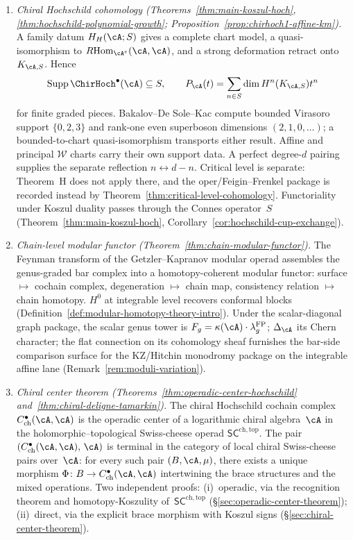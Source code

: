 \begin{enumerate}[label=\emph{(\arabic*)}]
\item \emph{Chiral Hochschild cohomology
 (Theorems~\ref{thm:main-koszul-hoch},
 \ref{thm:hochschild-polynomial-growth};
 Proposition~\ref{prop:chirhoch1-affine-km}).}
 A family datum $H_H(\cA;S)$ gives a complete chart model, a
 quasi-isomorphism to
 $R\!\operatorname{Hom}_{\cA^e}(\cA,\cA)$, and a strong deformation
 retract onto $K_{\cA,S}$.  Hence
 \[
  \operatorname{Supp}\ChirHoch^\bullet(\cA)\subseteq S,
  \qquad
  P_\cA(t)=\sum_{n\in S}\dim H^n(K_{\cA,S})t^n
 \]
 for finite graded pieces.  Bakalov--De Sole--Kac compute bounded
 Virasoro support $\{0,2,3\}$ and rank-one even superboson dimensions
 $(2,1,0,\ldots)$; a bounded-to-chart quasi-isomorphism transports
 either result.  Affine and principal $\mathcal W$ charts carry their
 own support data.  A perfect degree-$d$ pairing supplies the separate
 reflection $n\leftrightarrow d-n$.
 Critical level is separate:
 Theorem~H does not apply there, and the oper/Feigin--Frenkel package
 is recorded instead by Theorem~\ref{thm:critical-level-cohomology}.
 Functoriality under Koszul duality passes through the Connes
 operator~$S$
 \textup{(}Theorem~\ref{thm:main-koszul-hoch},
 Corollary~\ref{cor:hochschild-cup-exchange}\textup{)}.

\item \emph{Chain-level modular functor
 (Theorem~\ref{thm:chain-modular-functor}).}
 The Feynman transform of the Getzler--Kapranov modular operad
 assembles the genus-graded bar complex into a homotopy-coherent
 modular functor: surface $\mapsto$ cochain complex,
 degeneration $\mapsto$ chain map, consistency relation $\mapsto$ chain
 homotopy. $H^0$ at integrable level recovers conformal blocks
 (Definition~\ref{def:modular-homotopy-theory-intro}).
 Under the scalar-diagonal graph package, the scalar genus tower is
 $F_g = \kappa(\cA) \cdot \lambda_g^{\mathrm{FP}}$;
 $\Delta_\cA$
 its Chern character; the flat connection on its cohomology sheaf
 furnishes the bar-side comparison surface for the KZ/Hitchin
 monodromy package on the integrable affine
 lane
 (Remark~\ref{rem:moduli-variation}).

\item \emph{Chiral center theorem
 (Theorems~\textup{\ref{thm:operadic-center-hochschild}}
 and~\textup{\ref{thm:chiral-deligne-tamarkin}}).}
 The chiral Hochschild cochain complex
 $C^\bullet_{\mathrm{ch}}(\cA,\cA)$ is the operadic center of a
 logarithmic chiral algebra~$\cA$ in the holomorphic--topological
 Swiss-cheese operad $\mathsf{SC}^{\mathrm{ch,top}}$. The pair
 $(C^\bullet_{\mathrm{ch}}(\cA,\cA),\, \cA)$ is terminal in the
 category of local chiral Swiss-cheese pairs over~$\cA$: for every
 such pair $(B, \cA, \mu)$, there exists a unique morphism
 $\Phi \colon B \to C^\bullet_{\mathrm{ch}}(\cA,\cA)$
 intertwining the brace structures and the mixed operations.
 Two independent proofs: (i)~operadic, via the recognition theorem
 and homotopy-Koszulity of~$\mathsf{SC}^{\mathrm{ch,top}}$
 (\S\ref{sec:operadic-center-theorem}); (ii)~direct, via the
 explicit brace morphism with Koszul signs
 (\S\ref{sec:chiral-center-theorem}).

\end{enumerate}

